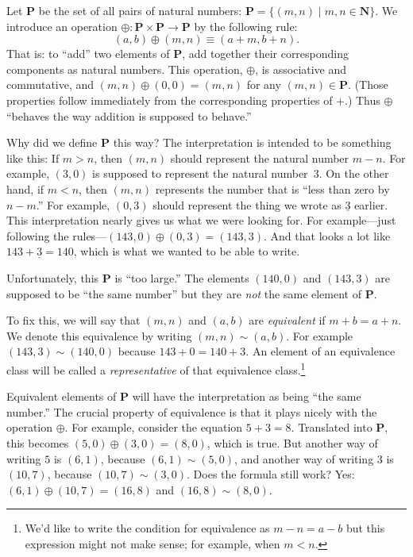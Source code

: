 \documentclass[10pt, a4paper, twocolumn]{article}
\newcommand{\set}[1]{\mathbold{#1}}
\newcommand{\N}{\set{N}}
\newcommand{\pairs}{\set{P}}
\newcommand{\minus}[1]{\underline{#1}}
\begin{document}
Let $\pairs$ be the set of all pairs of natural numbers: $\pairs =
\{(m, n) \mid m,n\in \N\}$. We introduce an operation
$\oplus:\pairs\times\pairs\to\pairs$ by the following rule:
\begin{equation}\label{pairs:addition}
  (a, b) \oplus (m, n) \equiv (a + m, b + n).
\end{equation}
That is: to ``add'' two elements of $\pairs$, add together their
corresponding components as natural numbers. This operation, $\oplus$, is
associative and commutative, and $(m,n)\oplus(0,0) = (m,n)$ for any
$(m,n)\in\pairs$. (Those properties follow immediately from the
corresponding properties of $+$.) Thus $\oplus$ ``behaves the way addition
is supposed to behave.''

Why did we define $\pairs$ this way? The interpretation is intended to
be something like this: If $m>n$, then $(m,n)$ should represent the
natural number $m-n$. For example, $(3,0)$ is supposed to represent
the natural number~$3$. On the other hand, if $m<n$, then $(m,n)$
represents the number that is ``less than zero by $n-m$.'' For
example, $(0,3)$ should represent the thing we wrote as $\minus{3}$
earlier. This interpretation nearly gives us what we were looking
for. For example---just following the rules---$(143,0) \oplus (0,3) =
(143,3)$. And that looks a lot like $143+\minus{3}=140$, which is what
we wanted to be able to write.

Unfortunately, this $\pairs$ is ``too large.'' The elements $(140,0)$
and $(143,3)$ are supposed to be ``the same number'' but they are
\emph{not} the same element of $\pairs$.

To fix this, we will say that $(m,n)$ and $(a,b)$ are
\emph{equivalent} if $m + b = a + n$. We denote this equivalence by
writing $(m,n) \sim (a,b)$. For example $(143,3)\sim(140,0)$ because
$143+0=140+3$. An element of an equivalence class will be called a
\emph{representative} of that equivalence class.\footnote{We'd like to
write the condition for equivalence as $m-n=a-b$ but this expression
might not make sense; for example, when $m<n$.}

Equivalent elements of $\pairs$ will have the interpretation as being
``the same number.'' The crucial property of equivalence is that it
plays nicely with the operation $\oplus$. For example, consider the
equation $5+3=8$. Translated into $\pairs$, this becomes
$(5,0)\oplus(3,0)=(8,0)$, which is true. But another way of writing $5$ is
$(6,1)$, because $(6,1)\sim(5,0)$, and another way of writing $3$ is
$(10,7)$, because $(10,7)\sim(3,0)$. Does the formula still work? Yes:
$(6,1)\oplus(10,7)=(16,8)$ and $(16,8)\sim(8,0)$.
\end{document}
